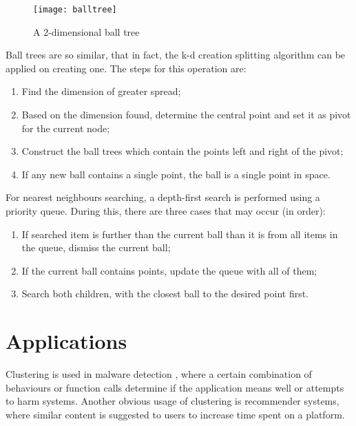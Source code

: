 \begin{figure}[b!]
\centering
\texttt{[image: balltree]}
\caption{A 2-dimensional ball tree}
\label{fig:balltree}
\end{figure}

Ball trees are so similar, that in fact, the k-d creation splitting algorithm can be applied on creating one. The steps for this operation are:

\begin{enumerate}
\item{Find the dimension of greater spread;}
\item{Based on the dimension found, determine the central point and set it as pivot for the current node;}
\item{Construct the ball trees which contain the points left and right of the pivot;}
\item{If any new ball contains a single point, the ball is a single point in space.}
\end{enumerate}

For nearest neighbours searching, a depth-first search is performed using a priority queue. During this, there are three cases that may occur (in order):

\begin{enumerate}
\item{If searched item is further than the current ball than it is from all items in the queue, dismiss the current ball;}
\item{If the current ball contains points, update the queue with all of them;}
\item{Search both children, with the closest ball to the desired point first.}
\end{enumerate}

\section{Applications}
\label{sec:cluster_applications}

Clustering is used in malware detection \cite{malware}, where a certain combination of behaviours or function calls determine if the application means well or attempts to harm systems. Another obvious usage of clustering is recommender systems, where similar content is suggested to users to increase time spent on a platform.
